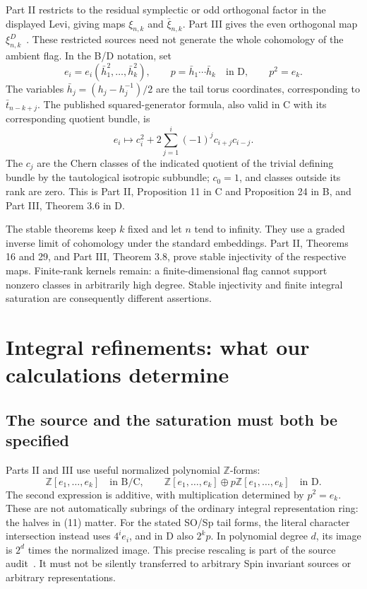 \documentclass[11pt,letterpaper]{article}
\newcommand{\Z}{\mathbb Z}\newcommand{\Q}{\mathbb Q}\newcommand{\C}{\mathbb C}
\theoremstyle{definition}\newtheorem{definition}[theorem]{Definition}
\begin{document}
Part II restricts to the residual symplectic or odd orthogonal factor
in the displayed Levi, giving maps \(\xi_{n,k}\) and
\(\bar\xi_{n,k}\). Part III gives the even orthogonal map
\(\xi^D_{n,k}\)~\cite{KR,KX}. These restricted sources need not generate the whole
cohomology of the ambient flag. In the B/D notation, set
\[
 e_i=e_i(\bar h_1^2,\ldots,\bar h_k^2),\qquad
 p=\bar h_1\cdots\bar h_k\quad\text{in D},\qquad p^2=e_k.
 \tag{13}
\]
The variables \(\bar h_j=(h_j-h_j^{-1})/2\) are the tail torus
coordinates, corresponding to \(\bar t_{n-k+j}\).
The published squared-generator formula, also valid in C with its
corresponding quotient bundle, is
\[
 e_i\longmapsto
 c_i^2+2\sum_{j=1}^{i}(-1)^j c_{i+j}c_{i-j}.
 \tag{14}
\]
The \(c_j\) are the Chern classes of the indicated quotient of the
trivial defining bundle by the tautological isotropic subbundle;
\(c_0=1\), and classes outside its rank are zero.
This is Part II, Proposition 11 in C and Proposition 24 in B,
and Part III, Theorem 3.6 in D.

The stable theorems keep \(k\) fixed and let \(n\) tend to infinity.
They use a graded inverse limit of cohomology under the standard
embeddings. Part II, Theorems 16 and 29, and Part III, Theorem 3.8,
prove stable injectivity of the respective maps. Finite-rank kernels
remain: a finite-dimensional flag cannot support nonzero classes in
arbitrarily high degree. Stable injectivity and finite integral
saturation are consequently different assertions.

\section{Integral refinements: what our calculations determine}
\subsection{The source and the saturation must both be specified}
Parts II and III use useful normalized polynomial \(\Z\)-forms:
\[
 \Z[e_1,\ldots,e_k]\quad\text{in B/C},\qquad
 \Z[e_1,\ldots,e_k]\oplus p\Z[e_1,\ldots,e_k]\quad\text{in D}.
 \tag{15}
\]
The second expression is additive, with multiplication determined by
\(p^2=e_k\). These are not automatically subrings of the ordinary
integral representation ring: the halves in (11) matter.
For the stated SO/Sp tail forms, the literal character intersection
instead uses \(4^ie_i\), and in D also \(2^kp\). In polynomial
degree \(d\), its image is \(2^d\) times the normalized image.
This precise rescaling is part of the source audit~\cite{Companions}.
It must not be silently transferred to arbitrary Spin invariant
sources or arbitrary representations.
\end{document}
